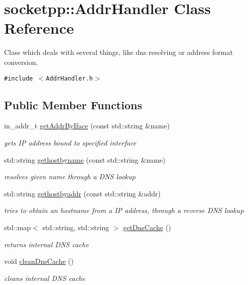 \hypertarget{classsocketpp_1_1AddrHandler}{
\section{socketpp::AddrHandler Class Reference}
\label{classsocketpp_1_1AddrHandler}
}
Class which deals with several things, like dns resolving or address format conversion.  


{\tt \#include $<$AddrHandler.h$>$}

\subsection*{Public Member Functions}
\begin{CompactItemize}
\item 
in\_\-addr\_\-t \hyperlink{classsocketpp_1_1AddrHandler_75b342f24605c5d167aabaa0422ff1ad}{getAddrByIface} (const std::string \&name)
\begin{CompactList}\small\item\em gets IP address bound to specified interface \item\end{CompactList}\item 
std::string \hyperlink{classsocketpp_1_1AddrHandler_19aebc1e9779dee4e5f06d7b39e18959}{gethostbyname} (const std::string \&name)
\begin{CompactList}\small\item\em resolves given name through a DNS lookup \item\end{CompactList}\item 
std::string \hyperlink{classsocketpp_1_1AddrHandler_2e9b9e6dc7ea4fc4a3500665b3f4062d}{gethostbyaddr} (const std::string \&addr)
\begin{CompactList}\small\item\em tries to obtain an hostname from a IP address, through a reverse DNS lookup \item\end{CompactList}\item 
std::map$<$ std::string, std::string $>$ \hyperlink{classsocketpp_1_1AddrHandler_4e10f2291b27d7db2a2860502721f960}{getDnsCache} ()
\begin{CompactList}\small\item\em returns internal DNS cache \item\end{CompactList}\item 
\hypertarget{classsocketpp_1_1AddrHandler_89a2929af6c042fd7e16661303dfabcb}{
void \hyperlink{classsocketpp_1_1AddrHandler_89a2929af6c042fd7e16661303dfabcb}{cleanDnsCache} ()}
\label{classsocketpp_1_1AddrHandler_89a2929af6c042fd7e16661303dfabcb}

\begin{CompactList}\small\item\em cleans internal DNS cache \item\end{CompactList}\end{CompactItemize}
